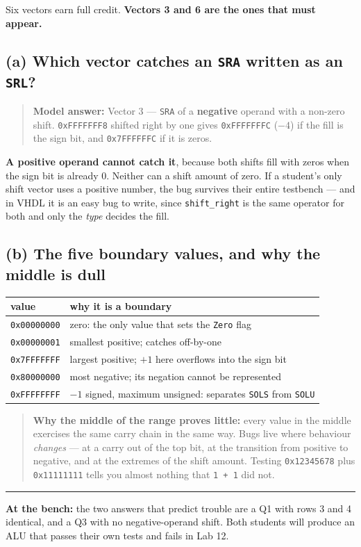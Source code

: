 \documentclass[11pt]{article}
\newcommand{\code}[1]{\texttt{#1}}
\newcommand{\hr}{\vspace{2pt}\hrule\vspace{6pt}}
\begin{document}
Six vectors earn full credit. \textbf{Vectors 3 and 6 are the ones that must
appear.}

\subsection*{(a) Which vector catches an \code{SRA} written as an \code{SRL}?}

\begin{quote}
\textbf{Model answer:} Vector 3 --- \code{SRA} of a \textbf{negative} operand with
a non-zero shift. \code{0xFFFFFFF8} shifted right by one gives \code{0xFFFFFFFC}
($-4$) if the fill is the sign bit, and \code{0x7FFFFFFC} if it is zeros.
\end{quote}

\textbf{A positive operand cannot catch it}, because both shifts fill with zeros
when the sign bit is already 0. Neither can a shift amount of zero. If a student's
only shift vector uses a positive number, the bug survives their entire testbench
--- and in VHDL it is an easy bug to write, since \code{shift\_right} is the same
operator for both and only the \emph{type} decides the fill.

\subsection*{(b) The five boundary values, and why the middle is dull}

\begin{center}
\begin{tabular}{ll}
\toprule
value & why it is a boundary \\
\midrule
\code{0x00000000} & zero: the only value that sets the \code{Zero} flag \\
\code{0x00000001} & smallest positive; catches off-by-one \\
\code{0x7FFFFFFF} & largest positive; $+1$ here overflows into the sign bit \\
\code{0x80000000} & most negative; its negation cannot be represented \\
\code{0xFFFFFFFF} & $-1$ signed, maximum unsigned: separates \code{SOLS} from \code{SOLU} \\
\bottomrule
\end{tabular}
\end{center}

\begin{quote}
\textbf{Why the middle of the range proves little:} every value in the middle
exercises the same carry chain in the same way. Bugs live where behaviour
\emph{changes} --- at a carry out of the top bit, at the transition from positive
to negative, and at the extremes of the shift amount. Testing \code{0x12345678}
plus \code{0x11111111} tells you almost nothing that \code{1 + 1} did not.
\end{quote}

\vspace{6pt}
\hr
{\small \textbf{At the bench:} the two answers that predict trouble are a Q1 with
rows 3 and 4 identical, and a Q3 with no negative-operand shift. Both students
will produce an ALU that passes their own tests and fails in Lab 12.}
\end{document}
